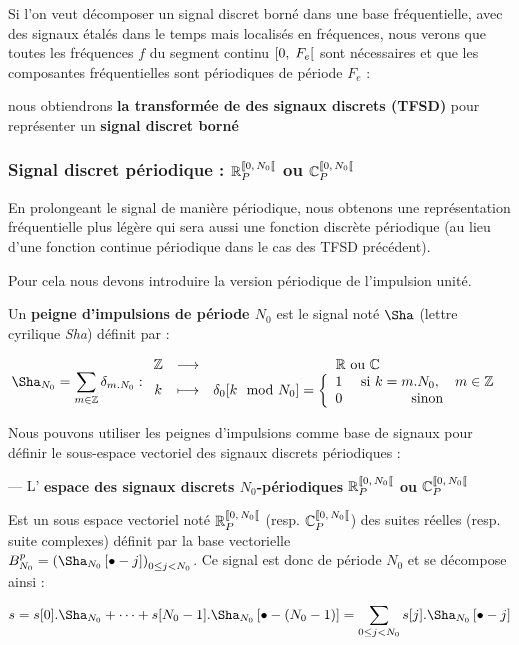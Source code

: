 \begin{remarque}
  Si l'on veut décomposer un signal discret borné dans une base
  fréquentielle, avec des signaux étalés dans le temps mais localisés
  en fréquences, nous verons que toutes les fréquences $f$ du segment
  continu $\left[0,\;F_e\right[$ sont nécessaires et que les composantes
  fréquentielles sont périodiques de période $F_e$ :

  nous obtiendrons \textbf{la transformée de \Fourier{} des signaux
    discrets (TFSD)} pour représenter un \textbf{signal discret borné}
\end{remarque}


\subsubsection{Signal discret périodique : $\RNper$ ou $\CNper$}
En prolongeant le signal de manière périodique, nous obtenons une
représentation fréquentielle plus légère qui sera aussi une fonction
discrète périodique (au lieu d'une fonction continue périodique dans
le cas des TFSD précédent).

Pour cela nous devons introduire la version périodique de l'impulsion unité.

\begin{definition}
  Un \textbf{peigne d'impulsions de période $N_0$} est le signal noté
  $\Sha$ (lettre cyrilique \emph{Sha}) définit par :
  
  \begin{equation*}
    \Sha_{N_0} = \sum\limits_{m\in\mathbb{Z}} \delta_{m.N_0}: \application{\Z}{\R \text{ ou } \C}{k}{\delta_0[k\mod{}N_0]=\pparMorceaux{1}{\text{ si } k = m.N_0,\quad m\in\Z}{0}{\text{ sinon}}}
\end{equation*}

\end{definition}

Nous pouvons utiliser les peignes d'impulsions comme base de signaux pour définir le sous-espace vectoriel des signaux discrets périodiques :
\begin{definition}
  \label{def:signal_discret_periodique}
  --- L' \textbf{espace des signaux discrets $N_0$-périodiques $\RNper$ ou $\CNper$}

  Est un sous espace vectoriel noté $\RNper$ (resp. $\CNper$) des
  suites réelles (resp. suite complexes) définit par la base
  vectorielle \\$B_{N_0}^p=\left(\Sha_{N_0}\b{\bullet-j}\right)_{0\leq
    j<N_0}$. Ce signal est donc de période
  $N_0$ et se décompose ainsi :
  \begin{equation*}
    s = s[0].\Sha_{N_0} + \dots + s[N_0-1].\Sha_{N_0}\b{\bullet-(N_0-1)} = \somme{0\leq j< N_0}{}{s[j].\Sha_{N_0}\b{\bullet-j}}
  \end{equation*}
 
\end{definition}

